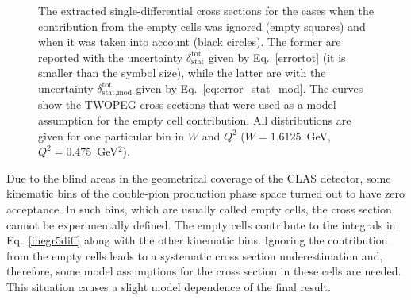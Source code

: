 \documentclass[prc,twocolumn,superscriptaddress,showpacs,amssymb,amsmath,amsfonts,aps,nofootinbib]{revtex4-1}
\begin{document}
\begin{figure}[htp]
\begin{center}
\caption{\small The extracted single-differential cross sections  for the cases when the contribution from the empty cells was ignored (empty squares) and when it was taken into account (black circles). The former are reported with the uncertainty $\delta_{\text{stat}}^{\text{tot}}$ given by Eq.~\eqref{errortot} (it is smaller than the symbol size), while the latter are with the uncertainty $\delta_{\text{stat,mod}}^{\text{tot}}$ given by Eq.~\eqref{eq:error_stat_mod}.
The curves show the TWOPEG cross sections that were used as a model assumption for the empty cell contribution. All distributions are given for one particular bin in $W$ and $Q^2$ ($W = 1.6125$~GeV, $Q^2 = 0.475$~GeV$^2$).} \label{fig:topologies}
\end{center}
\end{figure}






Due to the blind areas in the geometrical coverage of the CLAS detector, some kinematic bins of the double-pion production phase space turned out to have zero acceptance. 
In such bins, which are usually called empty cells,  the cross section cannot be experimentally defined. The empty cells contribute to the integrals in Eq.~\eqref{inegr5diff} along with the other kinematic bins.  Ignoring the contribution from the empty cells leads to a systematic cross section underestimation and, therefore, some model assumptions for the cross section in these cells are needed. This situation causes a slight model dependence of the final result. 
\end{document}
